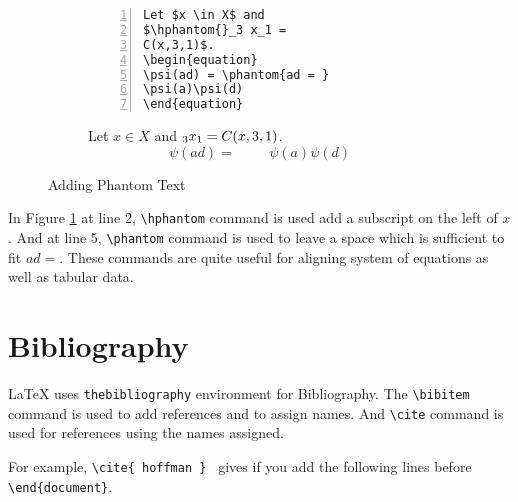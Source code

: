 \documentclass{article}
\theoremstyle{definition}
\theoremstyle{remark}
\begin{document}
\begin{figure}[h]
\centering
\begin{subfigure}{0.45\textwidth}
\begin{Verbatim}[numbers = left]
Let $x \in X$ and
$\hphantom{}_3 x_1 =
C(x,3,1)$.
\begin{equation}
\psi(ad) = \phantom{ad = }
\psi(a)\psi(d)
\end{equation}
\end{Verbatim}
\end{subfigure}
\begin{subfigure}{0.45\textwidth}
Let $x \in X$ and
$\hphantom{}_3 x_1 =
C(x,3,1)$.
\begin{equation}
\psi(ad) = \phantom{ad = }
\psi(a)\psi(d)
\end{equation}
\end{subfigure} 
\caption{Adding Phantom Text}
\label{fig:phantom}
\end{figure}

	In Figure \ref{fig:phantom} at line 2, \texttt{\textbackslash hphantom} command is used add a subscript on the left of $x$. And at line 5, \texttt{\textbackslash phantom} command is used to leave a space which is sufficient to fit $ad = $. These commands are quite useful for aligning system of equations as well as tabular data.

\section{Bibliography}
	\LaTeX{} uses \texttt{thebibliography} environment for Bibliography. The \texttt{\textbackslash bibitem} command is used to add references and to assign names. And \texttt{\textbackslash cite} command is used for references using the names assigned.

	For example, \texttt{\textbackslash cite\{ hoffman \} } gives \cite{hoffman} if you add the following lines before \texttt{\textbackslash end\{document\}}.
\end{document}
